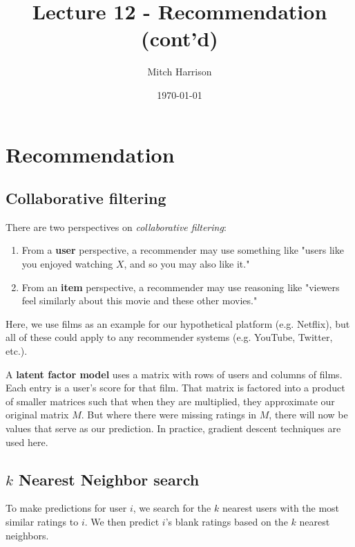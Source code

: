 \documentclass[titlepage, 12pt, leqno]{article}
\title{\Huge{Lecture 12 - Recommendation (cont'd)}}
\author{\large{Mitch Harrison}}
\date{\today}
\begin{document}
\setlength{\parskip}{1\baselineskip}
\setlength{\parindent}{15pt}
\maketitle
\tableofcontents
\newpage


\section{Recommendation}

\subsection{Collaborative filtering}
There are two perspectives on \textit{collaborative filtering}:
\begin{enumerate}
    \item From a \textbf{user} perspective, a recommender may use something like
        "users like you enjoyed watching $X$, and so you may also like it."
    \item From an \textbf{item} perspective, a recommender may use reasoning
        like "viewers feel similarly about this movie and these other movies."
\end{enumerate}

\begin{note}
    Here, we use films as an example for our hypothetical platform (e.g. Netflix),
    but all of these could apply to any recommender systems (e.g. YouTube,
    Twitter, etc.).
\end{note}

\begin{definition}
    A \textbf{latent factor model} uses a matrix with rows of users and columns
    of films. Each entry is a user's score for that film. That matrix is factored
    into a product of smaller matrices such that when they are multiplied, they
    approximate our original matrix $M$. But where there were missing ratings in
    $M$, there will now be values that serve as our prediction. In practice, 
    gradient descent techniques are used here.
\end{definition}

\subsection{$k$ Nearest Neighbor search}
To make predictions for user $i$, we search for the $k$ nearest users with the
most similar ratings to $i$. We then predict $i$'s blank ratings based on the $k$
nearest neighbors.
\end{document}
